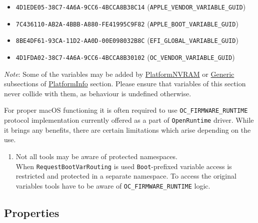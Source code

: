 \documentclass[]{article}
\makeatletter
\providecommand{\tightlist}{%
  \setlength{\itemsep}{0pt}\setlength{\parskip}{0pt}}
\renewcommand{\label}[1]{%
\zref@wrapper@immediate{\oldlabel{#1}}}  %
\makeatother
\begin{document}
\begin{itemize}
\tightlist
\item
  \texttt{4D1EDE05-38C7-4A6A-9CC6-4BCCA8B38C14}
  (\texttt{APPLE\_VENDOR\_VARIABLE\_GUID})
\item
  \texttt{7C436110-AB2A-4BBB-A880-FE41995C9F82}
  (\texttt{APPLE\_BOOT\_VARIABLE\_GUID})
\item
  \texttt{8BE4DF61-93CA-11D2-AA0D-00E098032B8C}
  (\texttt{EFI\_GLOBAL\_VARIABLE\_GUID})
\item
  \texttt{4D1FDA02-38C7-4A6A-9CC6-4BCCA8B30102}
  (\texttt{OC\_VENDOR\_VARIABLE\_GUID})
\end{itemize}

\emph{Note}: Some of the variables may be added by
\hyperref[platforminfonvram]{PlatformNVRAM} or
\hyperref[platforminfogeneric]{Generic} subsections of
\hyperref[platforminfo]{PlatformInfo} section.
Please ensure that variables of this section never collide with them,
as behaviour is undefined otherwise.

For proper macOS functioning it is often required to use \texttt{OC\_FIRMWARE\_RUNTIME}
protocol implementation currently offered as a part of \texttt{OpenRuntime} driver.
While it brings any benefits, there are certain limitations which arise depending on the
use.

\begin{enumerate}
\item Not all tools may be aware of protected namespaces.\\
  When \texttt{RequestBootVarRouting} is used \texttt{Boot}-prefixed variable access
  is restricted and protected in a separate namespace. To access the original variables
  tools have to be aware of \texttt{OC\_FIRMWARE\_RUNTIME} logic.
\end{enumerate}

\subsection{Properties}\label{nvramprops}
\end{document}
